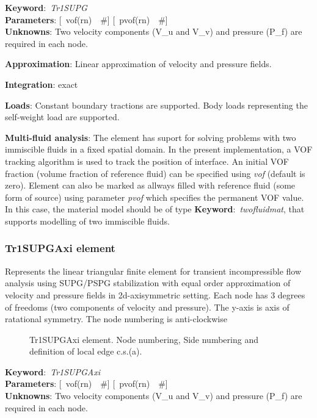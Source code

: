 \documentclass[12pt,dvips]{article}
\newcommand{\descitem}[1]{{\noindent \bf #1}:}
\newcommand{\elemkeyword}[1]{\descitem{Keyword}~{\em #1}}
\newcommand{\elemparam}[2]{{{#1\tiny (#2)}~~\#}}
\newcommand{\optelemparam}[2]{{[~\elemparam{#1}{#2}]}}
\newcommand{\param}[1]{{\it #1}}
\begin{document}
\elemkeyword{Tr1SUPG}\\
\descitem{Parameters} \optelemparam{vof}{rn}
\optelemparam{pvof}{rn}\\
\descitem{Unknowns}
Two velocity components (V\_u and V\_v) and pressure (P\_f) are required in each node.

\descitem{Approximation} Linear approximation of velocity and pressure
fields.

\descitem{Integration}
exact

\descitem{Loads} Constant boundary tractions are supported. Body loads
representing the self-weight load are supported.

\descitem{Multi-fluid analysis} The element has suport for solving
problems with two immiscible fluids in
a fixed spatial domain. In the present implementation, a VOF tracking algorithm
is used to track the position of interface. An initial VOF fraction
(volume fraction of reference fluid) can be specified using
\param{vof} (default is zero). Element can also be marked as allways
filled with reference fluid (some form of source) using parameter
\param{pvof} which specifies the permanent VOF value. In this case,
the material model should be of type \elemkeyword{twofluidmat}, that
supports modelling of two immiscible fluids.

\subsubsection{Tr1SUPGAxi element}
\label{Tr1SUPG}
Represents the linear triangular finite element for transient
incompressible flow analysis using SUPG/PSPG stabilization with equal order
approximation of velocity and pressure fields in 2d-axisymmetric setting. Each node has 3 degrees
of freedoms (two components of velocity and pressure). The y-axis is
axis of ratational symmetry. The node numbering is anti-clockwise

\begin{figure}[tb]
\begin{center}\end{center}
\caption{Tr1SUPGAxi element. Node numbering, Side numbering and
definition of local edge c.s.(a).}
\label{Tr1SUPGAxifig}
\end{figure}

\elemkeyword{Tr1SUPGAxi}\\
\descitem{Parameters} \optelemparam{vof}{rn}
\optelemparam{pvof}{rn}\\
\descitem{Unknowns}
Two velocity components (V\_u and V\_v) and pressure (P\_f) are required in each node.
\end{document}
